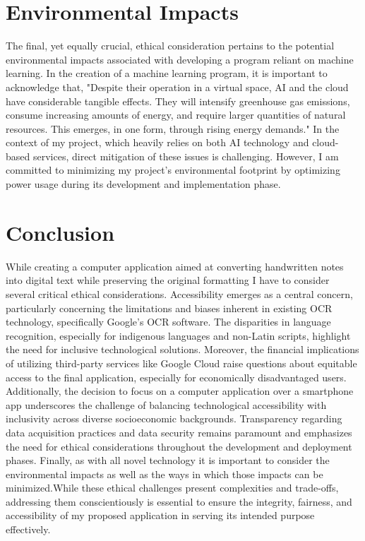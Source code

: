 \documentclass[10pt,twocolumn]{article}
\begin{document}
\section{Environmental Impacts}
The final, yet equally crucial, ethical consideration pertains to the potential environmental impacts associated with developing a program reliant on machine learning. In the creation of a machine learning program, it is important to acknowledge that, "Despite their operation in a virtual space, AI and the cloud have considerable tangible effects. They will intensify greenhouse gas emissions, consume increasing amounts of energy, and require larger quantities of natural resources. This emerges, in one form, through rising energy demands."\cite{AIclimate} In the context of my project, which heavily relies on both AI technology and cloud-based services, direct mitigation of these issues is challenging. However, I am committed to minimizing my project's environmental footprint by optimizing power usage during its development and implementation phase.

\section{Conclusion}
While creating a  computer application aimed at converting handwritten notes into digital text while preserving the original formatting I have to consider several critical ethical considerations. Accessibility emerges as a central concern, particularly concerning the limitations and biases inherent in existing OCR technology, specifically Google's OCR software. The disparities in language recognition, especially for indigenous languages and non-Latin scripts, highlight the need for inclusive technological solutions. Moreover, the financial implications of utilizing third-party services like Google Cloud raise questions about equitable access to the final application, especially for economically disadvantaged users. Additionally, the decision to focus on a computer application over a smartphone app underscores the challenge of balancing technological accessibility with inclusivity across diverse socioeconomic backgrounds. Transparency regarding data acquisition practices and data security remains paramount and emphasizes the need for ethical considerations throughout the development and deployment phases.  Finally, as with all novel technology it is important to consider the environmental impacts as well as the ways in which those impacts can be minimized.While these ethical challenges present complexities and trade-offs, addressing them conscientiously is essential to ensure the integrity, fairness, and accessibility of my proposed application in serving its intended purpose effectively.

\printbibliography
\end{document}
